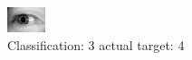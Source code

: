 \begin{figure}[h!]
\begin{center}
\includegraphics[width=0.60\columnwidth]{figures/ID3149_class_3_target_4.png}
\end{center}
\caption{ Classification: 3 actual target: 4}
\label{fig:ID3149_class_3_target_4}
\end{figure}
